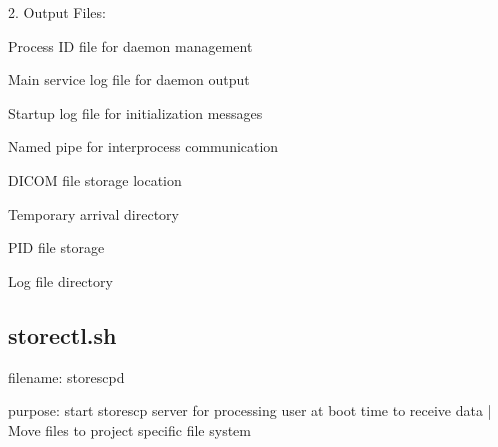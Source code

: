 \documentclass[letterpaper,10pt,english]{sphinxmanual}
\begin{document}
\begin{DUlineblock}{0em}
\item[] 2. Output Files:
\end{DUlineblock}

\begin{DUlineblock}{0em}
\item[] \sphinxhyphen{}  \sphinxhyphen{} Process ID file for daemon management
\item[] \sphinxhyphen{}  \sphinxhyphen{} Main service log file for daemon output
\item[] \sphinxhyphen{}  \sphinxhyphen{} Startup log file for initialization messages
\item[] \sphinxhyphen{}  \sphinxhyphen{} Named pipe for inter\sphinxhyphen{}process communication
\end{DUlineblock}

\sphinxAtStartPar
{}

\begin{DUlineblock}{0em}
\item[] \sphinxhyphen{}  \sphinxhyphen{} DICOM file storage location
\item[] \sphinxhyphen{}  \sphinxhyphen{} Temporary arrival directory
\item[] \sphinxhyphen{}  \sphinxhyphen{} PID file storage
\item[] \sphinxhyphen{}  \sphinxhyphen{} Log file directory
\end{DUlineblock}


\subsection{storectl.sh}
\label{\detokenize{Architecture/scripts/storectl:storectl-sh}}\label{\detokenize{Architecture/scripts/storectl::doc}}
\sphinxAtStartPar
filename: storescpd

\sphinxAtStartPar
purpose: start storescp server for processing user at boot time to receive data
|         Move files to project specific file system
\end{document}
